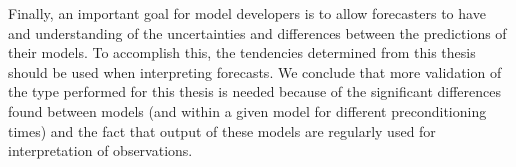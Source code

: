 Finally, an important goal for model developers is to allow forecasters to have
and understanding of the uncertainties and differences between the predictions of their models. To
accomplish this, the tendencies determined from this thesis should be
used when interpreting forecasts.
We conclude that more validation of the type performed for this thesis is
needed because of the significant differences found between models (and within a given model for different preconditioning times) and the fact that output of these models are regularly used for interpretation of observations.

